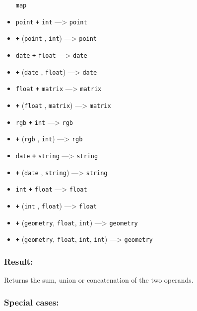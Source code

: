 \documentclass[]{book}
\theoremstyle{definition}
\theoremstyle{definition}
\theoremstyle{definition}
\theoremstyle{remark}
\begin{document}
\begin{itemize}
  \texttt{map}
\item
  \texttt{point} \textbf{\texttt{+}} \texttt{int} ---\textgreater{}
  \texttt{point}
\item
  \textbf{\texttt{+}} (\texttt{point} , \texttt{int}) ---\textgreater{}
  \texttt{point}
\item
  \texttt{date} \textbf{\texttt{+}} \texttt{float} ---\textgreater{}
  \texttt{date}
\item
  \textbf{\texttt{+}} (\texttt{date} , \texttt{float}) ---\textgreater{}
  \texttt{date}
\item
  \texttt{float} \textbf{\texttt{+}} \texttt{matrix} ---\textgreater{}
  \texttt{matrix}
\item
  \textbf{\texttt{+}} (\texttt{float} , \texttt{matrix})
  ---\textgreater{} \texttt{matrix}
\item
  \texttt{rgb} \textbf{\texttt{+}} \texttt{int} ---\textgreater{}
  \texttt{rgb}
\item
  \textbf{\texttt{+}} (\texttt{rgb} , \texttt{int}) ---\textgreater{}
  \texttt{rgb}
\item
  \texttt{date} \textbf{\texttt{+}} \texttt{string} ---\textgreater{}
  \texttt{string}
\item
  \textbf{\texttt{+}} (\texttt{date} , \texttt{string})
  ---\textgreater{} \texttt{string}
\item
  \texttt{int} \textbf{\texttt{+}} \texttt{float} ---\textgreater{}
  \texttt{float}
\item
  \textbf{\texttt{+}} (\texttt{int} , \texttt{float}) ---\textgreater{}
  \texttt{float}
\item
  \textbf{\texttt{+}} (\texttt{geometry}, \texttt{float}, \texttt{int})
  ---\textgreater{} \texttt{geometry}
\item
  \textbf{\texttt{+}} (\texttt{geometry}, \texttt{float}, \texttt{int},
  \texttt{int}) ---\textgreater{} \texttt{geometry}
\end{itemize}

\subsubsection{Result:}\label{result-9}

Returns the sum, union or concatenation of the two operands.

\subsubsection{Special cases:}\label{special-cases-7}
\end{document}
